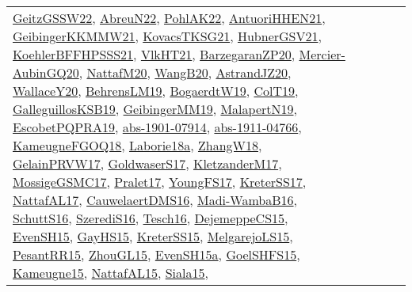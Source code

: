 {\begin{longtable}{lp{3cm}>{\raggedright}p{6cm}>{\raggedright}p{6cm}p{8cm}}
\href{papers/GeitzGSSW22.pdf}{GeitzGSSW22}\cite{GeitzGSSW22}, \href{articles/AbreuN22.pdf}{AbreuN22}\cite{AbreuN22}, \href{articles/PohlAK22.pdf}{PohlAK22}\cite{PohlAK22}, \href{papers/AntuoriHHEN21.pdf}{AntuoriHHEN21}\cite{AntuoriHHEN21}, \href{papers/GeibingerKKMMW21.pdf}{GeibingerKKMMW21}\cite{GeibingerKKMMW21}, \href{papers/KovacsTKSG21.pdf}{KovacsTKSG21}\cite{KovacsTKSG21}, \href{articles/HubnerGSV21.pdf}{HubnerGSV21}\cite{HubnerGSV21}, \href{articles/KoehlerBFFHPSSS21.pdf}{KoehlerBFFHPSSS21}\cite{KoehlerBFFHPSSS21}, \href{articles/VlkHT21.pdf}{VlkHT21}\cite{VlkHT21}, \href{papers/BarzegaranZP20.pdf}{BarzegaranZP20}\cite{BarzegaranZP20}, \href{papers/Mercier-AubinGQ20.pdf}{Mercier-AubinGQ20}\cite{Mercier-AubinGQ20}, \href{papers/NattafM20.pdf}{NattafM20}\cite{NattafM20}, \href{papers/WangB20.pdf}{WangB20}\cite{WangB20}, \href{articles/AstrandJZ20.pdf}{AstrandJZ20}\cite{AstrandJZ20}, \href{articles/WallaceY20.pdf}{WallaceY20}\cite{WallaceY20}, \href{papers/BehrensLM19.pdf}{BehrensLM19}\cite{BehrensLM19}, \href{papers/BogaerdtW19.pdf}{BogaerdtW19}\cite{BogaerdtW19}, \href{papers/ColT19.pdf}{ColT19}\cite{ColT19}, \href{papers/GalleguillosKSB19.pdf}{GalleguillosKSB19}\cite{GalleguillosKSB19}, \href{papers/GeibingerMM19.pdf}{GeibingerMM19}\cite{GeibingerMM19}, \href{papers/MalapertN19.pdf}{MalapertN19}\cite{MalapertN19}, \href{articles/EscobetPQPRA19.pdf}{EscobetPQPRA19}\cite{EscobetPQPRA19}, \href{articles/abs-1901-07914.pdf}{abs-1901-07914}\cite{abs-1901-07914}, \href{articles/abs-1911-04766.pdf}{abs-1911-04766}\cite{abs-1911-04766}, \href{papers/KameugneFGOQ18.pdf}{KameugneFGOQ18}\cite{KameugneFGOQ18}, \href{papers/Laborie18a.pdf}{Laborie18a}\cite{Laborie18a}, \href{articles/ZhangW18.pdf}{ZhangW18}\cite{ZhangW18}, \href{papers/GelainPRVW17.pdf}{GelainPRVW17}\cite{GelainPRVW17}, \href{papers/GoldwaserS17.pdf}{GoldwaserS17}\cite{GoldwaserS17}, \href{papers/KletzanderM17.pdf}{KletzanderM17}\cite{KletzanderM17}, \href{papers/MossigeGSMC17.pdf}{MossigeGSMC17}\cite{MossigeGSMC17}, \href{papers/Pralet17.pdf}{Pralet17}\cite{Pralet17}, \href{papers/YoungFS17.pdf}{YoungFS17}\cite{YoungFS17}, \href{articles/KreterSS17.pdf}{KreterSS17}\cite{KreterSS17}, \href{articles/NattafAL17.pdf}{NattafAL17}\cite{NattafAL17}, \href{papers/CauwelaertDMS16.pdf}{CauwelaertDMS16}\cite{CauwelaertDMS16}, \href{papers/Madi-WambaB16.pdf}{Madi-WambaB16}\cite{Madi-WambaB16}, \href{papers/SchuttS16.pdf}{SchuttS16}\cite{SchuttS16}, \href{papers/SzerediS16.pdf}{SzerediS16}\cite{SzerediS16}, \href{papers/Tesch16.pdf}{Tesch16}\cite{Tesch16}, \href{papers/DejemeppeCS15.pdf}{DejemeppeCS15}\cite{DejemeppeCS15}, \href{papers/EvenSH15.pdf}{EvenSH15}\cite{EvenSH15}, \href{papers/GayHS15.pdf}{GayHS15}\cite{GayHS15}, \href{papers/KreterSS15.pdf}{KreterSS15}\cite{KreterSS15}, \href{papers/MelgarejoLS15.pdf}{MelgarejoLS15}\cite{MelgarejoLS15}, \href{papers/PesantRR15.pdf}{PesantRR15}\cite{PesantRR15}, \href{papers/ZhouGL15.pdf}{ZhouGL15}\cite{ZhouGL15}, \href{articles/EvenSH15a.pdf}{EvenSH15a}\cite{EvenSH15a}, \href{articles/GoelSHFS15.pdf}{GoelSHFS15}\cite{GoelSHFS15}, \href{articles/Kameugne15.pdf}{Kameugne15}\cite{Kameugne15}, \href{articles/NattafAL15.pdf}{NattafAL15}\cite{NattafAL15}, \href{articles/Siala15.pdf}{Siala15}\cite{Siala15}, 
\end{longtable}}
